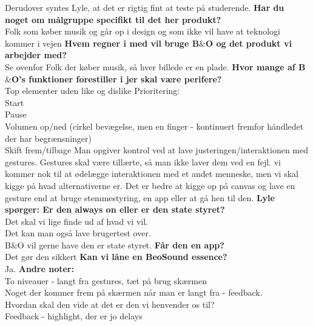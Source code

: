 Derudover syntes Lyle, at det er rigtig fint at teste på studerende.\blankline
%  
\textbf{Har du noget om målgruppe specifikt til det her produkt?}\\
Folk som køber musik og går op i design og som ikke vil have at teknologi kommer i vejen\blankline
%
\textbf{Hvem regner i med vil bruge B$\&$O og det produkt vi arbejder med?}\\
Se ovenfor 
Folk der køber musik, så hver billede er en plade. \blankline
%
\textbf{Hvor mange af B$\&$O’s funktioner forestiller i jer skal være perifere?}\\ 
Top elementer uden like og dislike \blankline
%
Prioritering:\\
Start\\
Pause \\
Volumen op/ned (cirkel bevægelse, men en finger - kontinuert fremfor håndledet der har begrænsninger)\\
Skift frem/tilbage\blankline
%
Man opgiver kontrol ved at lave justeringen/interaktionen med gestures. 
Gestures skal være tillærte, så man ikke laver dem ved en fejl. 
vi kommer nok til at ødelægge interaktionen med et andet menneske, men vi skal kigge på hvad alternativerne er. Det er bedre at kigge op på canvas og lave en gesture end at bruge stemmestyring, en app eller at gå hen til den. \blankline
%
\textbf{Lyle spørger: Er den always on eller er den state styret?}\\
Det skal vi lige finde ud af hvad vi vil. \\
Det kan man også lave brugertest over. \\
B$\&$O vil gerne have den er state styret.\blankline
%
\textbf{Får den en app?}\\
Det gør den sikkert\blankline
%
\textbf{Kan vi låne en BeoSound essence?}\\
Ja.\blankline
%
\textbf{Andre noter:} \\
To niveauer - langt fra gestures, tæt på brug skærmen \\
Noget der kommer frem på skærmen når man er langt fra - feedback. \\
Hvordan skal den vide at det er den vi henvender os til? \\
Feedback - highlight, der er jo delays \\


